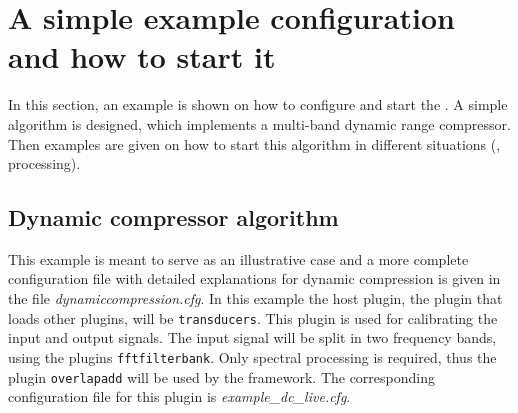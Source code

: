 \section{A simple example configuration and how to start it}%
\label{sec:scenarios}%
%
%
%

In this section, an example is shown on how to configure and start the
\mha{}. A simple algorithm is designed, which implements a 
multi-band dynamic range compressor. Then examples are given on
how to start this algorithm in different situations (\mhad{}, \Matlab{} processing).

\subsection{Dynamic compressor algorithm}%
\label{sec:dyncmp}%

This example is meant to serve as an illustrative case and a more complete 
configuration file with detailed explanations for dynamic compression is given 
in the file \newline \emph{dynamiccompression.cfg}.
%
In this example the host plugin, the plugin that loads other plugins, 
will be \verb!transducers!. This plugin is used for calibrating the 
input and output signals.
%
The input signal will be split in two frequency bands, using the \mha{}
plugins \verb!fftfilterbank!. Only spectral processing is required, thus
the plugin \verb!overlapadd! will be
used by the framework. The corresponding configuration file for this
plugin is \emph{example\_dc\_live.cfg}.

